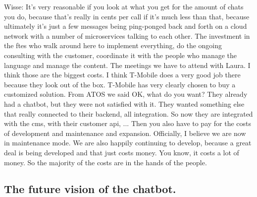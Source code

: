 \begin{appendices}
	Wisse: It's very reasonable if you look at what you get for the amount of chats you do, because that's really in cents per call if it's much less than that, because ultimately it's just a few messages being ping-ponged back and forth on a cloud network with a number of microservices talking to each other. The investment in the \acrshort{fte}s who walk around here to implement everything, do the ongoing consulting with the customer, coordinate it with the people who manage the language and manage the content. The meetings we have to attend with Laura. I think those are the biggest costs. I think T-Mobile does a very good job there because they look out of the box. T-Mobile has very clearly chosen to buy a customized solution. From ATOS we said OK, what do you want? They already had a chatbot, but they were not satisfied with it. They wanted something else that really connected to their backend, all integration. So now they are integrated with the \acrshort{cms}, with their customer \acrshort{api}, ... Then you also have to pay for the costs of development and maintenance and expansion. Officially, I believe we are now in maintenance mode. We are also happily continuing to develop, because a great deal is being developed and that just costs money. You know, \acrshort{it} costs a lot of money. So the majority of the costs are in the hands of the people.
	
	\subsection{The future vision of the chatbot.}

\end{appendices}
